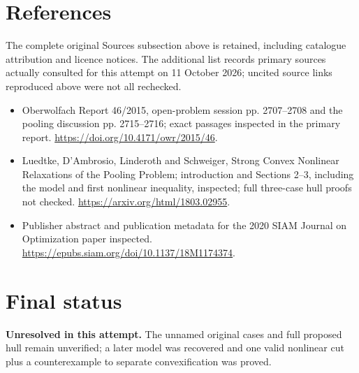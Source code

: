 \documentclass[11pt]{article}
\begin{document}
\section{References}
The complete original Sources subsection above is retained, including catalogue attribution and licence notices. The additional list records primary sources actually consulted for this attempt on 11 October 2026; uncited source links reproduced above were not all rechecked.
\begin{itemize}
\item Oberwolfach Report 46/2015, open-problem session pp. 2707--2708 and the pooling discussion pp. 2715--2716; exact passages inspected in the primary report. \url{https://doi.org/10.4171/owr/2015/46}.
\item Luedtke, D’Ambrosio, Linderoth and Schweiger, Strong Convex Nonlinear Relaxations of the Pooling Problem; introduction and Sections 2--3, including the model and first nonlinear inequality, inspected; full three-case hull proofs not checked. \url{https://arxiv.org/html/1803.02955}.
\item Publisher abstract and publication metadata for the 2020 SIAM Journal on Optimization paper inspected. \url{https://epubs.siam.org/doi/10.1137/18M1174374}.
\end{itemize}
\section{Final status}
\textbf{Unresolved in this attempt.} The unnamed original cases and full proposed hull remain unverified; a later model was recovered and one valid nonlinear cut plus a counterexample to separate convexification was proved.
\end{document}
